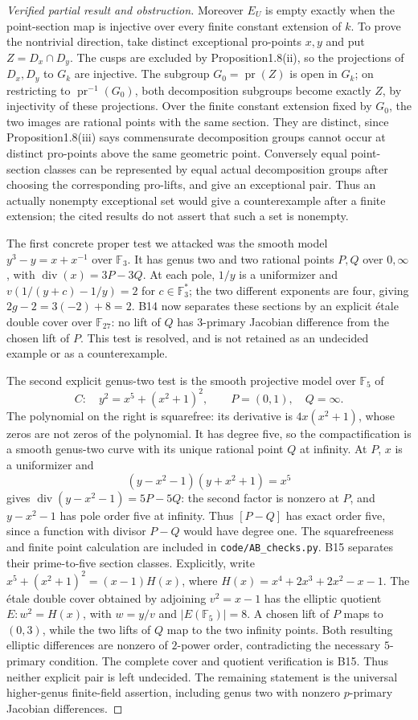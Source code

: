 \begin{proof}[Verified partial result and obstruction]
Moreover $E_U$ is empty exactly when the point-section map is
injective over every finite constant extension of $k$. To prove the
nontrivial direction, take distinct exceptional pro-points $x,y$
and put $Z=D_x\cap D_y$. The cusps are excluded by Proposition1.8(ii),
so the projections of $D_x,D_y$ to $G_k$ are injective. The subgroup
$G_0=\operatorname{pr}(Z)$ is open in $G_k$; on restricting to
$\operatorname{pr}^{-1}(G_0)$, both decomposition subgroups become
exactly $Z$, by injectivity of these projections. Over the finite
constant extension fixed by $G_0$, the two images are rational
points with the same section. They are distinct, since
Proposition1.8(iii) says commensurate decomposition groups cannot
occur at distinct pro-points above the same geometric point.
Conversely equal point-section classes can be represented by equal
actual decomposition groups after choosing the corresponding
pro-lifts, and give an exceptional pair. Thus an actually nonempty
exceptional set would give a counterexample after a finite extension;
the cited results do not assert that such a set is nonempty.

The first concrete proper test we attacked was the smooth model
$y^3-y=x+x^{-1}$ over $\mathbb F_3$. It has genus two and two rational
points $P,Q$ over $0,\infty$, with $\operatorname{div}(x)=3P-3Q$.
At each pole, $1/y$ is a uniformizer and
$v(1/(y+c)-1/y)=2$ for $c\in\mathbb F_3^*$; the two different
exponents are four, giving $2g-2=3(-2)+8=2$.
B14 now separates these sections by an explicit \'etale double
cover over $\mathbb F_{27}$: no lift of $Q$ has $3$-primary Jacobian
difference from the chosen lift of $P$. This test is resolved, and
is not retained as an undecided example or as a counterexample.

The second explicit genus-two test is the smooth
projective model over $\mathbb F_5$ of
\[
 C:\quad y^2=x^5+(x^2+1)^2,\qquad P=(0,1),\quad Q=\infty.
\]
The polynomial on the right is squarefree: its derivative is
$4x(x^2+1)$, whose zeros are not zeros of the polynomial. It has
degree five, so the compactification is a smooth genus-two curve
with its unique rational point $Q$ at infinity. At $P$, $x$ is a
uniformizer and
\[
 (y-x^2-1)(y+x^2+1)=x^5
\]
gives $\operatorname{div}(y-x^2-1)=5P-5Q$: the second factor is
nonzero at $P$, and $y-x^2-1$ has pole order five at infinity.
Thus $[P-Q]$ has exact order five, since a function with divisor
$P-Q$ would have degree one. The squarefreeness and finite point
calculation are included in \texttt{code/AB\_checks.py}.
B15 separates their prime-to-five section classes. Explicitly,
write $x^5+(x^2+1)^2=(x-1)H(x)$, where
$H(x)=x^4+2x^3+2x^2-x-1$. The \'etale double cover obtained by
adjoining $v^2=x-1$ has the elliptic quotient
$E:w^2=H(x)$, with $w=y/v$ and $|E(\mathbb F_5)|=8$.
A chosen lift of $P$ maps to $(0,3)$, while the two lifts of $Q$
map to the two infinity points. Both resulting elliptic differences
are nonzero of $2$-power order, contradicting the necessary
$5$-primary condition. The complete cover and quotient verification
is B15. Thus neither explicit pair is left undecided. The remaining
statement is the universal higher-genus finite-field assertion,
including genus two with nonzero $p$-primary Jacobian differences.


\end{proof}
